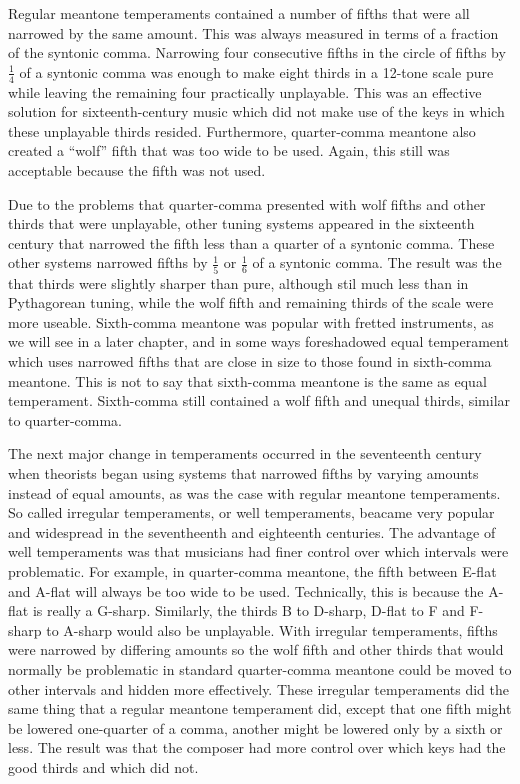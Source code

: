 Regular meantone temperaments contained a number of fifths that were all narrowed by the
same amount. This was always measured in terms of a fraction of the syntonic comma.
Narrowing four consecutive fifths in the circle of fifths by $ \frac{1}{4} $ of a syntonic
comma was enough to make eight thirds in a 12-tone scale pure while leaving the remaining
four practically unplayable.\autocite[33]{RD:1}  This was an effective solution for
sixteenth-century music which did not make use of the keys in which these unplayable
thirds resided.  Furthermore, quarter-comma meantone also created a ``wolf'' fifth that
was too wide to be used. Again, this still was acceptable because the fifth was not used.

Due to the problems that quarter-comma presented with wolf fifths and other thirds that
were unplayable, other tuning systems appeared in the sixteenth century that narrowed the
fifth less than a quarter of a syntonic comma.  These other systems narrowed fifths by $
\frac{1}{5} $ or $ \frac{1}{6} $ of a syntonic comma.  The result was the that thirds were
slightly sharper than pure, although stil much less than in Pythagorean tuning, while the
wolf fifth and remaining thirds of the scale were more useable.  Sixth-comma meantone was
popular with fretted instruments, as we will see in a later chapter, and in some ways
foreshadowed equal temperament which uses narrowed fifths that are close in size to those
found in sixth-comma meantone.  This is not to say that sixth-comma meantone is the same
as equal temperament.  Sixth-comma still contained a wolf fifth and unequal thirds,
similar to quarter-comma.

The next major change in temperaments occurred in the seventeenth century when theorists
began using systems that narrowed fifths by varying amounts instead of equal amounts, as
was the case with regular meantone temperaments.  So called irregular temperaments, or
well temperaments, beacame very popular and widespread in the seventheenth and eighteenth
centuries.  The advantage of well temperaments was that musicians had finer control over
which intervals were problematic.  For example, in quarter-comma meantone, the fifth
between E-flat and A-flat will always be too wide to be used.  Technically, this is
because the A-flat is really a G-sharp. \autocite[35]{RD:1}  Similarly, the thirds B to
D-sharp, D-flat to F and F-sharp to A-sharp would also be unplayable.  With irregular
temperaments, fifths were narrowed by differing amounts so the wolf fifth and other thirds
that would normally be problematic in standard quarter-comma meantone could be moved to
other intervals and hidden more effectively. These irregular temperaments did the same
thing that a regular meantone temperament did, except that one fifth might be lowered
one-quarter of a comma, another might be lowered only by a sixth or less.  The result was
that the composer had more control over which keys had the good thirds and which did not.

